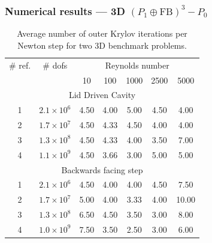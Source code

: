 \documentclass[presentation,aspectratio=43, 10pt]{beamer}
\begin{document}
\begin{frame}
  \frametitle{Numerical results --- 3D $(P_1 \oplus \text{FB})^3-P_0$}
  \begin{table}[htbp]
    \centering
    \begin{tabular}{cc|ccccc}
      \toprule
      \# ref. & \# dofs & \multicolumn{5}{c}{Reynolds number} \\
              && 10 & 100 & 1000 & 2500 & 5000 \\
      \midrule
      \multicolumn{7}{c}{Lid Driven Cavity}\\
      \midrule
      1 & $2.1 \times 10^6$ & 4.50 & 4.00 & 5.00 & 4.50 & 4.00 \\
      2 & $1.7 \times 10^7$ & 4.50 & 4.33 & 4.50 & 4.00 & 4.00 \\
      3 & $1.3 \times 10^8$ & 4.50 & 4.33 & 4.00 & 3.50 & 7.00 \\
      4 & $1.1 \times 10^9$ & 4.50 & 3.66 & 3.00 & 5.00 & 5.00 \\
      \midrule
      \multicolumn{7}{c}{Backwards facing step}\\
      \midrule
      1 & $2.1 \times 10^6$ & 4.50 & 4.00 & 4.00 & 4.50 & 7.50  \\
      2 & $1.7 \times 10^7$ & 5.00 & 4.00 & 3.33 & 4.00 & 10.00 \\
      3 & $1.3 \times 10^8$ & 6.50 & 4.50 & 3.50 & 3.00 & 8.00  \\
      4 & $1.0 \times 10^9$ & 7.50 & 3.50 & 2.50 & 3.00 & 6.00  \\
    \end{tabular}
    \caption{Average number of outer Krylov iterations per Newton step for two 3D benchmark problems.}
    \label{tab:ourldc3d}
  \end{table}
\end{frame}
\end{document}
